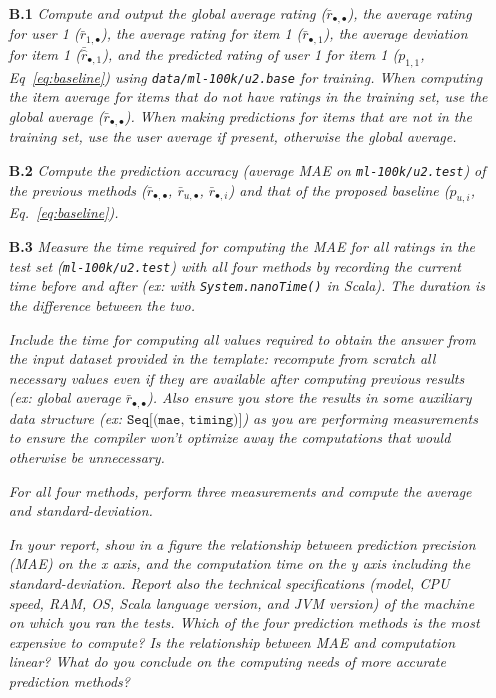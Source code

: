 \documentclass{article}
\begin{document}
\begin{itemize}
  
    \item[\textbf{B.1}] \textit{Compute and output the global average rating ($\bar r_{\bullet,\bullet}$), the average rating for user 1 ($\bar r_{1,\bullet}$),  the average rating for item 1 ($\bar r_{\bullet,1}$), the average deviation for item 1 ($\bar{\hat r}_{\bullet,1}$), and the predicted rating of user 1 for item 1 ($p_{1,1}$, Eq~\ref{eq:baseline}) using \texttt{data/ml-100k/u2.base} for training. When computing the item average for items that do not have ratings in the training set, use the global average ($\bar r_{\bullet, \bullet}$). When making predictions for items that are not in the training set, use the user average if present, otherwise the global average.}
  
    \item [\textbf{B.2}] \textit{Compute the prediction accuracy (average MAE on \texttt{ml-100k/u2.test}) of the previous methods ($\bar r_{\bullet, \bullet}$, $\bar r_{u,\bullet}$, $\bar r_{\bullet,i}$) and that of the proposed baseline ($p_{u,i}$, Eq.~\ref{eq:baseline}). }

  \item [\textbf{B.3}] \textit{Measure the time required for computing the MAE for all ratings in the test set (\texttt{ml-100k/u2.test}) with all four methods by recording the current time before and after (ex: with \texttt{System.nanoTime()} in Scala). The duration is the difference between the two. } 
 
 \textit{ 
Include the time for computing all values required to obtain the answer from the input dataset provided in the template: recompute from scratch all necessary values even if they are available after computing previous results (ex: global average $\bar r_{\bullet, \bullet}$). Also ensure you store the results in some auxiliary data structure (ex: $\texttt{Seq[(mae, timing)]}$) as you are performing measurements to ensure the compiler won't optimize away the computations that would otherwise be unnecessary.}

\textit{
 For all four methods, perform three measurements and compute the average and standard-deviation.}
 
 \textit{In your report, show in a figure the relationship between prediction precision (MAE) on the x axis, and the computation time on the y axis including the standard-deviation. Report also the technical specifications (model, CPU speed, RAM, OS, Scala language version, and JVM version) of the machine on which you ran the tests. Which of the four prediction methods is the most expensive to compute? Is the relationship between MAE and computation linear? What do you conclude on the computing needs of more accurate prediction methods?}

\end{itemize}
\end{document}
